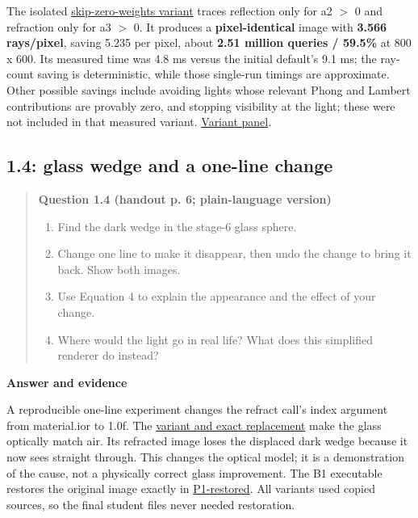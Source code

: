 \documentclass[11pt,a4paper]{article}
\begin{document}
The isolated \href{https://github.com/Champy2005/Lab09-RayTracing/blob/main/evidence/data/variants/skip-zero-weights/changes.json}{skip-zero-weights variant} traces reflection only for a2 \ensuremath{>} 0 and refraction only for a3 \ensuremath{>} 0. It produces a \textbf{pixel-identical} image with \textbf{3.566 rays/\allowbreak{}pixel}, saving 5.235 per pixel, about \textbf{2.51 million queries /\allowbreak{} 59.5\%} at 800 x 600. Its measured time was 4.8 ms versus the initial default's 9.1 ms; the ray-count saving is deterministic, while those single-run timings are approximate. Other possible savings include avoiding lights whose relevant Phong and Lambert contributions are provably zero, and stopping visibility at the light; these were not included in that measured variant. \href{https://github.com/Champy2005/Lab09-RayTracing/blob/main/evidence/terminal/P1-skip-zero-weights.txt}{Variant panel}.


\subsection*{1.4: glass wedge and a one-line change}
\begin{quote}\small
\textbf{Question 1.4 (handout p. 6; plain-language version)}


\begin{enumerate}
\item Find the dark wedge in the stage-6 glass sphere.
\item Change one line to make it disappear, then undo the change to bring it back. Show both images.
\item Use Equation 4 to explain the appearance and the effect of your change.
\item Where would the light go in real life? What does this simplified renderer do instead?
\end{enumerate}\end{quote}
\textbf{Answer and evidence}


A reproducible one-line experiment changes the refract call's index argument from material.ior to 1.0f. The \href{https://github.com/Champy2005/Lab09-RayTracing/blob/main/evidence/data/variants/glass-ior-one/changes.json}{variant and exact replacement} make the glass optically match air. Its refracted image loses the displaced dark wedge because it now sees straight through. This changes the optical model; it is a demonstration of the cause, not a physically correct glass improvement. The B1 executable restores the original image exactly in \href{https://github.com/Champy2005/Lab09-RayTracing/blob/main/evidence/terminal/P1-restored.txt}{P1-restored}. All variants used copied sources, so the final student files never needed restoration.
\end{document}
